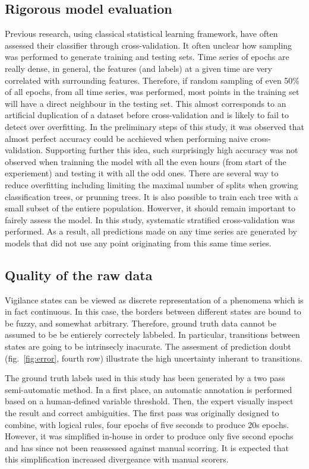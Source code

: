 \subsection{Rigorous model evaluation} 

Previous research, using classical statistical learning framework,
have often assessed their classifier through cross-validation.
It often unclear how sampling was performed to generate training and testing sets.
Time series of epochs are really dense, in general,
the features (and labels) at a given time are very correlated with surrounding features.
Therefore, if random sampling of even 50\% of all epochs, from all time series, was performed,
most points in the training set will have a direct neighbour in the testing set.
This almost corresponds to an artificial duplication of a dataset before cross-validation and is likely to fail to detect over overfitting.
In the preliminary steps of this study, it was observed that almost perfect accuracy could be acchieved when performing naive cross-validation.
Supporting further this idea, such surprisingly high accuracy was not observed when trainning the model
with all the even hours (from start of the experiement) and testing it with all the odd ones.
There are several way to reduce overfitting including limiting the maximal number of splits when growing classification trees, or prunning trees.
It is also possible to train each tree with a small subset of the entiere population.
Howerver, it should remain important to fairely assess the model.
In this study, systematic stratified cross-validation was performed.
As a result, all predictions made on any time series are generated by models that did not use any point originating from this same time series.

\subsection{Quality of the raw data} 

Vigilance states can be viewed as discrete representation of a phenomena which is in fact continuous.
In this case, the borders between different states are bound to be fuzzy, and somewhat arbitrary.
Therefore, ground truth data cannot be assumed to be be entierely correctely labbeled.
In particular, transitions between states are going to be intrinsecly inacurate.
The assesment of prediction doubt (fig.~\ref{fig:error}, fourth row) illustrate the high uncertainty inherant to transitions. 

The ground truth labels used in this study has been generated by a two pass semi-automatic method.
In a first place, an automatic annotation is performed based on a human-defined variable threshold.
Then, the expert visually inspect the result and correct ambiguities.
The first pass was originally designed to combine, with logical rules, four epochs of five seconds to produce 20s epochs\citationneeded{}.
However, it was simplified in-house in order to produce
only five second epochs and has since not been reassessed against manual scorring.
It is expected that this simplification increased divergeance with manual scorers.

